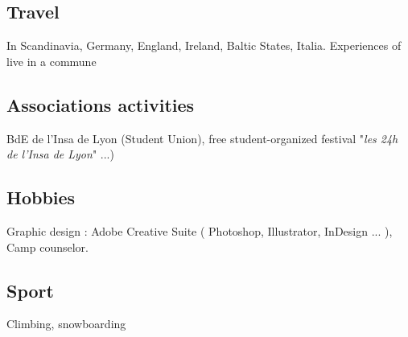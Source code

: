 	\subsection{Travel}
		{In Scandinavia, Germany, England, Ireland, Baltic States, Italia. Experiences of live in a commune}
		
	\subsection{Associations activities}
		{BdE de l'Insa de Lyon (Student Union), free student-organized festival "\textit{les 24h de l'Insa de Lyon}" ...)}
		
	\subsection{Hobbies}
		{Graphic design : Adobe Creative Suite ( Photoshop, Illustrator, InDesign ... ),\\Camp counselor.}
		
	\subsection{Sport}
		{Climbing, snowboarding}
		
